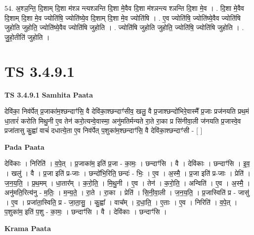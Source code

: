 \documentclass[17pt]{extarticle}
\begin{document}
54. अ॒श्ञ॒न्ति॒ दि॒शाम् दि॒शा म॑श्ञ न्त्यश्ञन्ति दि॒शा मे॒वैव दि॒शा म॑श्ञन्त्य श्ञन्ति दि॒शा मे॒व । . दि॒शा मे॒वैव दि॒शाम् दि॒शा मे॒व ज्योति॑षि॒ ज्योति॑ष्ये॒व दि॒शाम् दि॒शा मे॒व ज्योति॑षि । . ए॒व ज्योति॑षि॒ ज्योति॑ष्ये॒वैव ज्योति॑षि जुहोति जुहोति॒ ज्योति॑ष्ये॒वैव ज्योति॑षि जुहोति । . ज्योति॑षि जुहोति जुहोति॒ ज्योति॑षि॒ ज्योति॑षि जुहोति । . जु॒हो॒तीति॑ जुहोति । \newline
\pagebreak
{}

\section{ TS 3.4.9.1 }

\textbf{TS 3.4.9.1 } \newline
\textbf{Samhita Paata} \newline

देवि॑का॒ निव॑र्पेत् प्र॒जाका॑म॒श्छन्दाꣳ॑सि॒ वै देवि॑का॒श्छन्दाꣳ॑सीव॒ खलु॒ वै प्र॒जाश्छन्दो॑भिरे॒वास्मै᳚ प्र॒जाः प्रज॑नयति प्रथ॒मं धा॒तारं॑ करोति मिथु॒नी ए॒व तेन॑ करो॒त्यन्वे॒वास्मा॒ अनु॑मतिर्मन्यते रा॒ते रा॒का प्र सि॑नीवा॒ली ज॑नयति प्र॒जास्वे॒व प्रजा॑तासु कु॒ह्वा॑ वाचं॑ दधात्ये॒ता ए॒व निव॑र्पेत् प॒शुका॑म॒श्छन्दाꣳ॑सि॒ वै देवि॑का॒श्छन्दाꣳ॑सी - [  ] \newline

\textbf{Pada Paata} \newline

देवि॑काः । निरिति॑ । व॒पे॒त् । प्र॒जाका॑म॒ इति॑ प्र॒जा - का॒मः॒ । छन्दाꣳ॑सि । वै । देवि॑काः । छन्दाꣳ॑सि । इ॒व॒ । खलु॑ । वै । प्र॒जा इति॑ प्र-जाः । छन्दो॑भि॒रिति॒ छन्दः॑ - भिः॒ । ए॒व । अ॒स्मै॒ । प्र॒जा इति॑ प्र-जाः । प्रेति॑ । ज॒न॒य॒ति॒ । प्र॒थ॒मम् । धा॒तार᳚म् । क॒रो॒ति॒ । मि॒थु॒नी । ए॒व । तेन॑ । क॒रो॒ति॒ । अन्विति॑ । ए॒व । अ॒स्मै॒ । अनु॑मति॒रित्य॑नु - म॒तिः॒ । म॒न्य॒ते॒ । रा॒ते । रा॒का । प्रेति॑ । सि॒नी॒वा॒ली । ज॒न॒य॒ति॒ । प्र॒जास्विति॑ प्र - जासु॑ । ए॒व । प्रजा॑ता॒स्विति॒ प्र - जा॒ता॒सु॒ । कु॒ह्वा᳚ । वाच᳚म् । द॒धा॒ति॒ । ए॒ताः । ए॒व । निरिति॑ । व॒पे॒त् । प॒शुका॑म॒ इति॑ प॒शु - का॒मः॒ । छन्दाꣳ॑सि । वै । देवि॑काः । छन्दाꣳ॑सि ।  \newline


\textbf{Krama Paata} \newline
\end{document}
